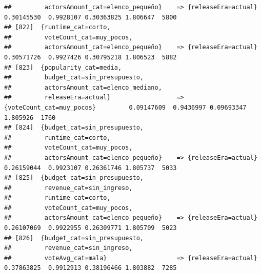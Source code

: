\documentclass[
]{article}
\begin{document}
\begin{verbatim}
##         actorsAmount_cat=elenco_pequeño}    => {releaseEra=actual}               0.30145530  0.9928107 0.30363825 1.806647  5800
## [822]  {runtime_cat=corto,                                                                                                      
##         voteCount_cat=muy_pocos,                                                                                                
##         actorsAmount_cat=elenco_pequeño}    => {releaseEra=actual}               0.30571726  0.9927426 0.30795218 1.806523  5882
## [823]  {popularity_cat=media,                                                                                                   
##         budget_cat=sin_presupuesto,                                                                                             
##         actorsAmount_cat=elenco_mediano,                                                                                        
##         releaseEra=actual}                  => {voteCount_cat=muy_pocos}         0.09147609  0.9436997 0.09693347 1.805926  1760
## [824]  {budget_cat=sin_presupuesto,                                                                                             
##         runtime_cat=corto,                                                                                                      
##         voteCount_cat=muy_pocos,                                                                                                
##         actorsAmount_cat=elenco_pequeño}    => {releaseEra=actual}               0.26159044  0.9923107 0.26361746 1.805737  5033
## [825]  {budget_cat=sin_presupuesto,                                                                                             
##         revenue_cat=sin_ingreso,                                                                                                
##         runtime_cat=corto,                                                                                                      
##         voteCount_cat=muy_pocos,                                                                                                
##         actorsAmount_cat=elenco_pequeño}    => {releaseEra=actual}               0.26107069  0.9922955 0.26309771 1.805709  5023
## [826]  {budget_cat=sin_presupuesto,                                                                                             
##         revenue_cat=sin_ingreso,                                                                                                
##         voteAvg_cat=mala}                   => {releaseEra=actual}               0.37863825  0.9912913 0.38196466 1.803882  7285

\end{verbatim}
\end{document}
